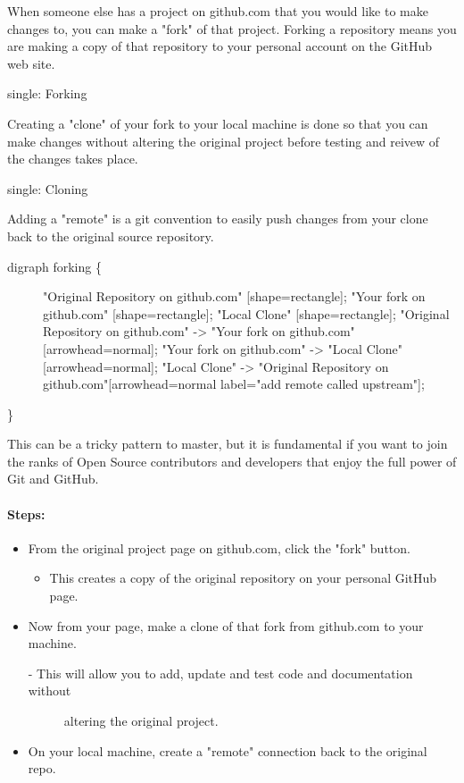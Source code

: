 When someone else has a project on github.com that you would like to
make changes to, you can make a "fork" of that project. Forking a
repository means you are making a copy of that repository to your
personal account on the GitHub web site.

single: Forking

Creating a "clone" of your fork to your local machine is done so that
you can make changes without altering the original project before
testing and reivew of the changes takes place.

single: Cloning

Adding a "remote" is a git convention to easily push changes from your
clone back to the original source repository.

\begin{description}
\item[digraph forking \{]
"Original Repository on github.com" {[}shape=rectangle{]}; "Your fork on
github.com" {[}shape=rectangle{]}; "Local Clone" {[}shape=rectangle{]};
"Original Repository on github.com" -\textgreater{} "Your fork on
github.com"{[}arrowhead=normal{]}; "Your fork on github.com"
-\textgreater{} "Local Clone"{[}arrowhead=normal{]}; "Local Clone"
-\textgreater{} "Original Repository on github.com"{[}arrowhead=normal
label="add remote called upstream"{]};
\end{description}

\}

This can be a tricky pattern to master, but it is fundamental if you
want to join the ranks of Open Source contributors and developers that
enjoy the full power of Git and GitHub.

\hypertarget{steps}{%
\paragraph{Steps:}\label{steps}}

\begin{itemize}
\tightlist
\item
  From the original project page on github.com, click the "fork" button.

  \begin{itemize}
  \tightlist
  \item
    This creates a copy of the original repository on your personal
    GitHub page.
  \end{itemize}
\item
  Now from your page, make a clone of that fork from github.com to your
  machine.

  \begin{description}
  \item[- This will allow you to add, update and test code and
  documentation without]
  altering the original project.
  \end{description}
\item
  On your local machine, create a "remote" connection back to the
  original repo.
\end{itemize}

